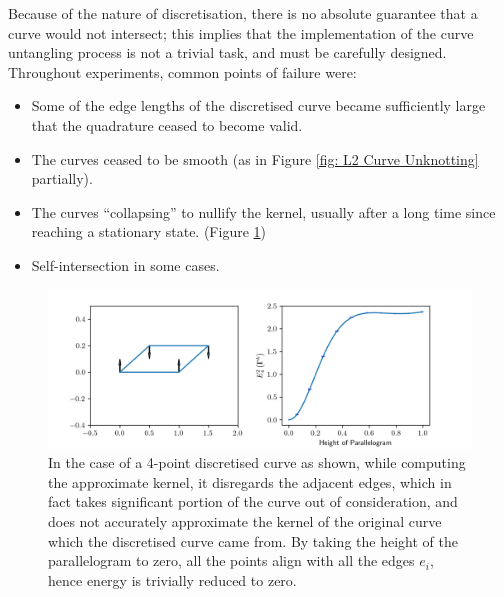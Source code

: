 \documentclass[../dissertation.tex]{subfiles}
\begin{document}
Because of the nature of discretisation, there is no absolute guarantee that a curve would not intersect;
this implies that the implementation of the curve untangling process is not a trivial task, and must be carefully designed.
Throughout experiments, common points of failure were:
\begin{itemize}
    \item Some of the edge lengths of the discretised curve became sufficiently large that the quadrature ceased to become valid.
    \item The curves ceased to be smooth (as in Figure \ref{fig: L2 Curve Unknotting} partially).
    \item The curves ``collapsing'' to nullify the kernel, usually after a long time since reaching a stationary state.
        (Figure \ref{fig: Collapse})
    \item Self-intersection in some cases.
\end{itemize}
\begin{figure}[tbp]
    \centering
    \includegraphics[width=\textwidth]{sections/conclusionImgs/FailureCollapse}
    \caption{
        In the case of a 4-point discretised curve as shown, while computing the approximate kernel,
        it disregards the adjacent edges, which in fact takes significant portion of the curve out of consideration,
        and does not accurately approximate the kernel of the original curve which the discretised curve came from.
        By taking the height of the parallelogram to zero, all the points align with all the edges $e_i$,
        hence energy is trivially reduced to zero.
    }
    \label{fig: Collapse}
\end{figure}
\end{document}
